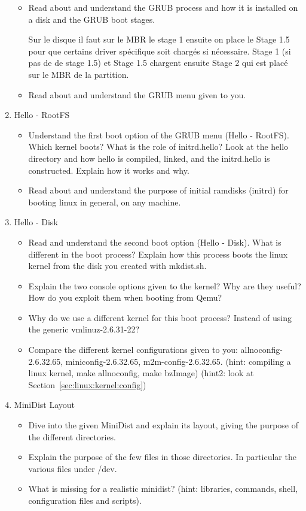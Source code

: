 \documentclass[10]{article}
\begin{document}
\begin{enumerate}
\begin{itemize}
 
\item Read about and understand the GRUB process and how it is installed on a disk and the GRUB boot stages.

Sur le disque il faut sur le MBR le stage 1 
ensuite on  place le Stage 1.5 pour que certains driver spécifique soit chargés si nécessaire. 
Stage 1 (si pas de de stage 1.5) et Stage 1.5 chargent ensuite Stage 2 qui est placé sur le MBR de la partition.
\item Read about and understand the GRUB menu given to you.\\

\end{itemize}

\item Hello - RootFS
\begin{itemize}
\item Understand the first boot option of the GRUB menu (Hello - RootFS).
Which kernel boots? What is the role of initrd.hello? Look at the
hello directory and how hello is compiled, linked, and the initrd.hello
is constructed. Explain how it works and why.
\item Read about and understand the purpose of initial ramdisks (initrd)
for booting linux in general, on any machine.
\end{itemize}

\item Hello - Disk
\begin{itemize}
\item Read and understand the second boot option (Hello - Disk).
What is different in the boot process? Explain how this process
boots the linux kernel from the disk you created with mkdist.sh.
\item Explain the two console options given to the kernel?
Why are they useful? How do you exploit them when booting from Qemu?
\item Why do we use a different kernel for this boot process?
Instead of using the generic vmlinuz-2.6.31-22?
\item Compare the different kernel configurations given to you:
allnoconfig-2.6.32.65, miniconfig-2.6.32.65, m2m-config-2.6.32.65.
(hint: compiling a linux kernel, make allnoconfig, make bzImage)
(hint2: look at Section~\ref{sec:linux:kernel:config})

\end{itemize}

\item MiniDist Layout
\begin{itemize}
\item Dive into the given MiniDist and explain its layout,
giving the purpose of the different directories.
\item Explain the purpose of the few files in those directories.
In particular the various files under /dev.
\item What is missing for a realistic minidist?
(hint: libraries, commands, shell, configuration files and scripts).
\end{itemize}

\end{enumerate}
\end{document}
